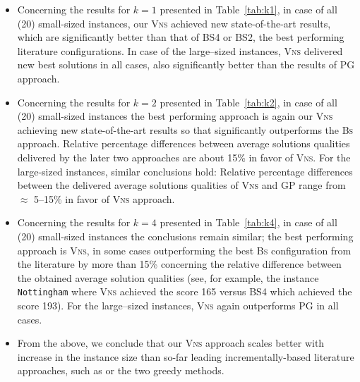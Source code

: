 \documentclass[dvipsnames,format=sigconf,anonymous=true,review=true]{acmart}
\begin{document}
   \begin{itemize}
   		\item  Concerning the results for $k=1$ presented in Table~\ref{tab:k1}, in case of all (20) small-sized instances, our \textsc{Vns} achieved new state-of-the-art results, which are   significantly better than that of BS4 or BS2, the best performing literature configurations. In case of the large--sized instances,   \textsc{Vns} delivered new best solutions in all cases, also significantly better than the results of \textsc{PG} approach.  
   		\item Concerning the results for $k=2$ presented in Table~\ref{tab:k2}, in case of all (20) small-sized instances the best performing approach is again our \textsc{Vns} achieving new state-of-the-art results so that significantly outperforms the \textsc{Bs} approach. Relative percentage differences between average solutions qualities delivered by the later two   approaches are about 15\% in favor of   \textsc{Vns}. For the large-sized instances, similar conclusions hold: Relative percentage differences between the  delivered average solutions qualities of \textsc{Vns} and \textsc{GP} range from  $\approx$ 5--15\% in favor of   \textsc{Vns} approach. 
   		\item Concerning the results for $k=4$ presented in Table~\ref{tab:k4}, in case of all (20) small-sized instances the conclusions remain similar; the best performing approach is \textsc{Vns}, in some cases outperforming the best \textsc{Bs} configuration from the  literature by more than 15\% concerning the relative difference  between the obtained average solution qualities (see, for example,  the instance \texttt{Nottingham} where \textsc{Vns} achieved the score 165 versus BS4 which achieved the score 193). For the large--sized instances, \textsc{Vns} again outperforms \textsc{PG} in all cases. 
   		\item From the above, we conclude that our \textsc{Vns} approach scales better with increase in the instance size than so-far leading incrementally-based literature approaches, such as  or the two greedy methods. 

\end{itemize}
\end{document}
